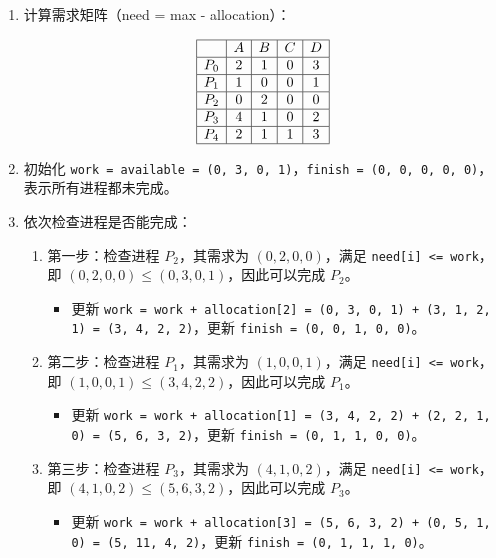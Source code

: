 \documentclass{article}
\begin{document}
\begin{enumerate}
	\item 
	计算需求矩阵（need = max - allocation）：
	
	$$
	\begin{array}{|c|c|c|c|c|}
		\hline
		& A & B & C & D \\
		\hline
		P_0 & 2 & 1 & 0 & 3 \\
		\hline
		P_1 & 1 & 0 & 0 & 1 \\
		\hline
		P_2 & 0 & 2 & 0 & 0 \\
		\hline
		P_3 & 4 & 1 & 0 & 2 \\
		\hline
		P_4 & 2 & 1 & 1 & 3 \\
		\hline
	\end{array}
	$$
	
	\item
	初始化 \texttt{work = available = (0, 3, 0, 1)}，\texttt{finish = (0, 0, 0, 0, 0)}，表示所有进程都未完成。
	
	\item 
	依次检查进程是否能完成：
	
	\begin{enumerate}
		\item 第一步：检查进程 $P_2$，其需求为 $(0, 2, 0, 0)$，满足 \texttt{need[i] <= work}，即 $(0, 2, 0, 0) \leq (0, 3, 0, 1)$，因此可以完成 $P_2$。
		\begin{itemize}
			\item 更新 \texttt{work = work + allocation[2] = (0, 3, 0, 1) + (3, 1, 2, 1) = (3, 4, 2, 2)}，更新 \texttt{finish = (0, 0, 1, 0, 0)}。
		\end{itemize}
		
		\item 第二步：检查进程 $P_1$，其需求为 $(1, 0, 0, 1)$，满足 \texttt{need[i] <= work}，即 $(1, 0, 0, 1) \leq (3, 4, 2, 2)$，因此可以完成 $P_1$。
		\begin{itemize}
			\item 更新 \texttt{work = work + allocation[1] = (3, 4, 2, 2) + (2, 2, 1, 0) = (5, 6, 3, 2)}，更新 \texttt{finish = (0, 1, 1, 0, 0)}。
		\end{itemize}
		
		\item 第三步：检查进程 $P_3$，其需求为 $(4, 1, 0, 2)$，满足 \texttt{need[i] <= work}，即 $(4, 1, 0, 2) \leq (5, 6, 3, 2)$，因此可以完成 $P_3$。
		\begin{itemize}
			\item 更新 \texttt{work = work + allocation[3] = (5, 6, 3, 2) + (0, 5, 1, 0) = (5, 11, 4, 2)}，更新 \texttt{finish = (0, 1, 1, 1, 0)}。
		\end{itemize}
		

\end{enumerate}
\end{enumerate}
\end{document}
